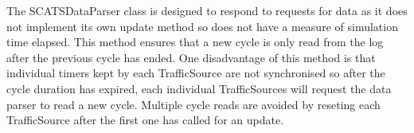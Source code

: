 The SCATSDataParser class is designed to respond to requests for data as it does not implement its own update method so does not have a measure of simulation time elapsed. This method ensures that a new cycle is only read from the log after the previous cycle has ended. One disadvantage of this method is that individual timers kept by each TrafficSource are not synchronised so after the cycle duration has expired, each individual TrafficSources will request the data parser to read a new cycle. Multiple cycle reads are avoided by reseting each TrafficSource after the first one has called for an update.























